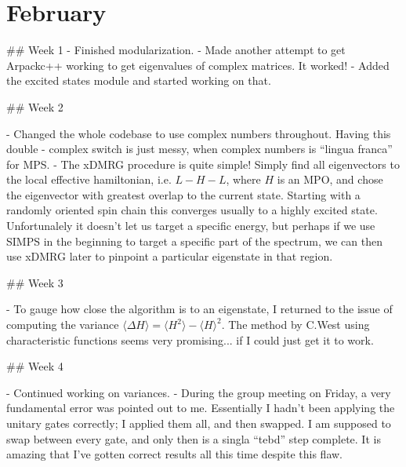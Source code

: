 \documentclass[a4paper]{article}
\begin{document}
\section*{February}

\begin{markdown}
## Week 1
- Finished modularization. 
- Made another attempt to get Arpackc++ working to get eigenvalues of complex matrices. It worked! 
- Added the excited states module and started working on that.

## Week 2

- Changed the whole codebase to use complex numbers throughout. Having this double - complex switch is just messy, when complex numbers is ``lingua franca'' for MPS. 
- The xDMRG procedure is quite simple! Simply find all eigenvectors to the local effective hamiltonian,  i.e. $L-H-L$, where $H$ is an MPO, and chose the eigenvector with greatest overlap to the current state. Starting with a randomly oriented spin chain this converges usually to a highly excited state. Unfortunalely it doesn't let us target a specific energy, but perhaps if we use SIMPS in the beginning to target a specific part of the spectrum, we can then use xDMRG later to pinpoint a particular eigenstate in that region.

## Week 3

- To gauge how close the algorithm is to an eigenstate, I returned to the issue of computing the variance $\langle \Delta H \rangle = \langle H^2 \rangle - \langle H \rangle^2$. The method by C.West using characteristic functions seems very promising... if I could just get it to work. 

## Week 4

- Continued working on variances. 
- During the group meeting on Friday, a very fundamental error was pointed out to me. Essentially I hadn't been applying the unitary gates correctly; I applied them all, and then swapped. I am supposed to swap between every gate, and only then is a singla ``tebd'' step complete. It is amazing that I've gotten correct results all  this time despite this flaw. 


\end{markdown}
\end{document}
